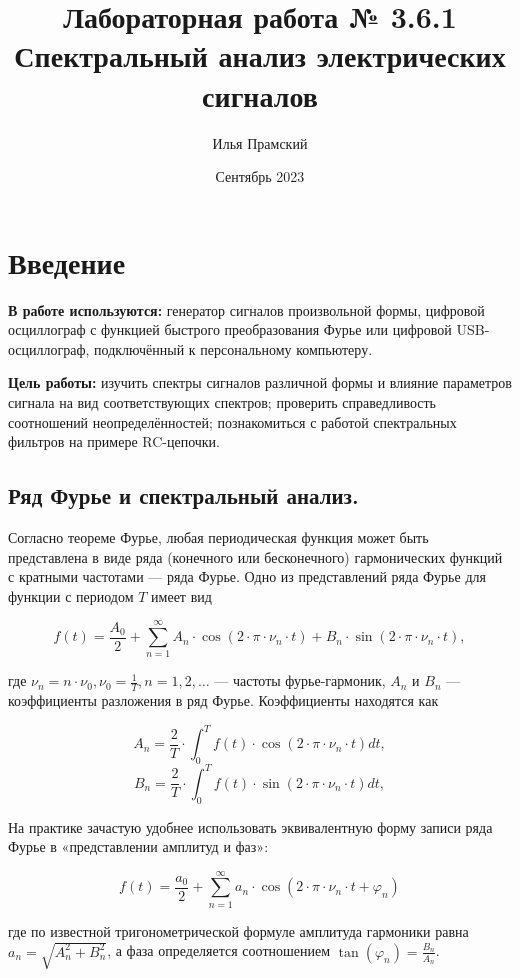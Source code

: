 \documentclass[a4paper,12pt]{article}
\title{Лабораторная работа № 3.6.1\\Спектральный анализ электрических сигналов}
\author{Илья Прамский}
\date{Сентябрь 2023}
\begin{document}
\maketitle
\newpage
\section*{Введение}

\textbf{В работе используются:} генератор сигналов произвольной формы, цифровой осциллограф с функцией быстрого преобразования Фурье или цифровой USB-осциллограф, подключённый к персональному компьютеру.

\textbf{Цель работы:} изучить спектры сигналов различной формы и влияние параметров сигнала на вид соответствующих спектров; проверить справедливость соотношений неопределённостей; познакомиться с работой спектральных фильтров на примере RC-цепочки.

\subsection*{Ряд Фурье и спектральный анализ.}

Согласно теореме Фурье, любая периодическая функция может быть представлена в виде ряда (конечного или
бесконечного) гармонических функций с кратными частотами — ряда Фурье. Одно из представлений ряда Фурье для функции с периодом $T$ имеет вид

\[f(t) = \frac{A_0}{2} + \sum_{n=1}^{\infty}A_n \cdot \cos(2 \cdot \pi \cdot \nu_n \cdot t) + B_n \cdot \sin(2 \cdot \pi \cdot \nu_n \cdot t),\]

где $\nu_n = n \cdot \nu_0, \nu_0 = \frac{1}{T}, n = 1,2, \ldots$ — частоты фурье-гармоник, $A_n$ и $B_n$ — коэффициенты разложения в ряд Фурье. Коэффициенты находятся как

\[A_n = \frac{2}{T} \cdot \int_0^T f(t) \cdot \cos(2 \cdot \pi \cdot \nu_n \cdot t) dt,\]
\[B_n = \frac{2}{T} \cdot \int_0^T f(t) \cdot \sin(2 \cdot \pi \cdot \nu_n \cdot t) dt,\]

На практике зачастую удобнее использовать эквивалентную форму записи
ряда Фурье в «представлении амплитуд и фаз»:

\[f(t) = \frac{a_0}{2} + \sum_{n=1}^{\infty} a_n \cdot \cos(2 \cdot \pi \cdot \nu_n \cdot t + \varphi_n)\]

где по известной тригонометрической формуле амплитуда гармоники равна $a_n = \sqrt{A_n^2 + B_n^2}$, а фаза определяется соотношением $\tan(\varphi_n) = \frac{B_n}{A_n}$.
\end{document}

